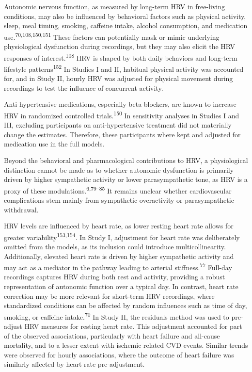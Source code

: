 \documentclass[
  a4paper,
  headsepline=true,
  open=any]{scrbook}
\begin{document}
Autonomic nervous function, as measured by long-term HRV in free-living
conditions, may also be influenced by behavioral factors such as
physical activity, sleep, meal timing, smoking, caffeine intake, alcohol
consumption, and medication use.\textsuperscript{70,108,150,151} These
factors can potentially mask or mimic underlying physiological
dysfunction during recordings, but they may also elicit the HRV
responses of interest.\textsuperscript{108} HRV is shaped by both daily
behaviors and long-term lifestyle patterns\textsuperscript{152} In
Studies I and II, habitual physical activity was accounted for, and in
Study II, hourly HRV was adjusted for physical movement during
recordings to test the influence of concurrent activity.

Anti-hypertensive medications, especially beta-blockers, are known to
increase HRV in randomized controlled trials.\textsuperscript{150} In
sensitivity analyses in Studies I and III, excluding participants on
anti-hypertensive treatment did not materially change the estimates.
Therefore, these participants where kept and adjusted for medication use
in the full models.

Beyond the behavioral and pharmacological contributions to HRV, a
physiological distinction cannot be made as to whether autonomic
dysfunction is primarily driven by higher sympathetic activity or lower
parasympathetic tone, as HRV is a proxy of these
modulations.\textsuperscript{6,79--85} It remains unclear whether
cardiovascular complications stem mainly from sympathetic overactivity
or parasympathetic withdrawal.

HRV levels are influenced by heart rate, as lower resting heart rate
allows for greater variability\textsuperscript{153,154}. In Study I,
adjustment for heart rate was deliberately omitted from the models, as
its inclusion could introduce multicollinearity. Additionally, elevated
heart rate is driven by higher sympathetic activity and may act as a
mediator in the pathway leading to arterial
stiffness.\textsuperscript{77} Full-day recordings captures HRV during
both rest and activity, providing a robust representation of autonomic
function over a typical day. In contrast, heart rate correction may be
more relevant for short-term HRV recordings, where standardized
conditions can be affected by random influences such as time of day,
smoking, or caffeine intake.\textsuperscript{70} In Study II, the
residuals method was used to pre-adjust HRV measures for resting heart
rate. This adjustment accounted for part of the observed associations,
particularly with heart failure and all-cause mortality, and to a lesser
extent with ischemic related CVD events. Similar trends were observed
for hourly associations, where the outcome of heart failure was
similarly affected by heart rate pre-adjustment.
\end{document}
